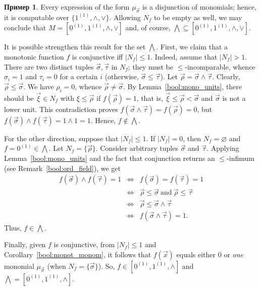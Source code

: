 \documentclass[12pt,notitlepage]{article}
\theoremstyle{plain}
\theoremstyle{definition}
\newtheorem{exm}[thm]{Пример}
\theoremstyle{plain}
\newcommand{\sbs}{\subseteq}
\newcommand{\void}{\varnothing}
\newcommand{\1}{\mathbf{1}}
\newcommand{\0}{\mathbf{0}}
\begin{document}
\begin{exm}
	Every expression of the form $\mu_{\vec \sigma}$ is a disjunction of monomials; hence, it is computable over $\{1^{(1)}, {\wedge}, {\vee} \}$. Allowing $N_f$ to be empty as well, we may conclude that $M = [0^{(1)}, 1^{(1)}, {\wedge},  {\vee}]$ and, of course, ${\bigwedge} \sbs [0^{(1)}, 1^{(1)}, {\wedge},  {\vee}]$.
	
	It is possible strengthen this result for the set ${\bigwedge}$. First, we claim that a monotonic function $f$ is conjunctive iff $|N_f| \leq 1$. Indeed, assume that $|N_f| > 1$. There are two distinct tuples $\vec{\sigma}, \vec{\tau}$ in $N_f$; they must be ${\leq}$-incomparable, whence $\sigma_i = 1$ and $\tau_i = 0$ for a certain $i$ (otherwise, $\vec \sigma \leq \vec \tau$). Let $\vec \rho = \vec \sigma \wedge \vec \tau$. Clearly, $\vec \rho \leq \vec \sigma$. We have $\rho_i = 0$, whence $\vec \rho \neq \vec \sigma$. By Lemma~\ref{bool:mono_units}, there should be $\vec\xi \in N_f$ with $\xi \leq \vec \rho$ if $f(\vec \rho) = 1$, that is, $\vec \xi \leq \vec \rho < \vec \sigma$ and $\vec \sigma$ is not a lower unit. This contradiction proves $f(\vec \sigma \wedge \vec \tau) = f(\vec \rho) = 0$, but $f(\vec \sigma) \wedge f(\vec \tau) = 1 \wedge 1 = 1$. Hence, $f \notin {\bigwedge}$.
	
	For the other direction, suppose that $|N_f| \leq 1$. If $|N_f| = 0$, then $N_f = \void$ and $f = 0^{(1)} \in {\bigwedge}$. Let $N_f = \{ \vec \rho \}$. Consider arbitrary tuples $\vec \sigma$ and $\vec \tau$. Applying Lemma~\ref{bool:mono_units} and the fact that conjunction returns an ${\leq}$-infimum (see Remark~\ref{bool:ord_field}), we get
	$$
	\begin{array}{rcl}
		f(\vec \sigma) \wedge f(\vec \tau) = 1 &\iff& f(\vec \sigma) = f(\vec \tau) = 1\\
		&\iff& \vec \rho \leq \vec \sigma\ \mbox{and}\ \vec \rho \leq \vec \tau\\
		&\iff& \vec \rho \leq \vec \sigma \wedge \vec \tau\\
		&\iff& f(\vec \sigma \wedge \vec \tau) = 1.
	\end{array}
	$$
	Thus, $f \in {\bigwedge}$.
	
	Finally, given $f$ is conjunctive, from $|N_f| \leq 1$ and Corollary~\ref{bool:monot_monom}, it follows that $f(\vec x)$ equals either $0$ or \emph{one} monomial $\mu_{\vec \sigma}$ (when $N_f = \{\vec \sigma\}$). So, $f \in [0^{(1)}, 1^{(1)}, {\wedge}]$ and ${\bigwedge} = [0^{(1)}, 1^{(1)}, {\wedge}]$.
\end{exm}
\end{document}
